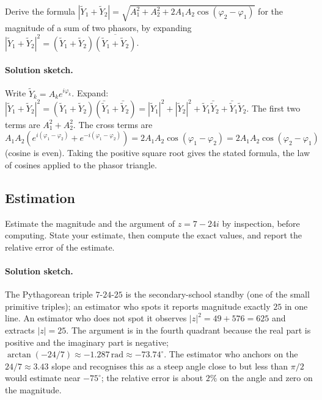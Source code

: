 \begin{exercise}
Derive the formula $|\tilde{Y}_{1} + \tilde{Y}_{2}| = \sqrt{A_{1}^{2}
+ A_{2}^{2} + 2 A_{1} A_{2}\cos(\varphi_{2} - \varphi_{1})}$
for the magnitude of a sum of two phasors, by expanding
$|\tilde{Y}_{1} + \tilde{Y}_{2}|^{2} = (\tilde{Y}_{1} +
\tilde{Y}_{2})\overline{(\tilde{Y}_{1} + \tilde{Y}_{2})}$.

\paragraph{Solution sketch.}
Write $\tilde Y_{k} = A_{k} e^{i\varphi_{k}}$. Expand:
$|\tilde Y_{1} + \tilde Y_{2}|^{2} = (\tilde Y_{1} + \tilde
Y_{2})(\bar{\tilde Y}_{1} + \bar{\tilde Y}_{2}) = |\tilde Y_{1}|^{2}
+ |\tilde Y_{2}|^{2} + \tilde Y_{1} \bar{\tilde Y}_{2} +
\bar{\tilde Y}_{1} \tilde Y_{2}$. The first two terms are $A_{1}^{2}
+ A_{2}^{2}$. The cross terms are $A_{1} A_{2} (e^{i(\varphi_{1}
- \varphi_{2})} + e^{-i(\varphi_{1} - \varphi_{2})}) = 2 A_{1}
A_{2} \cos(\varphi_{1} - \varphi_{2}) = 2 A_{1} A_{2} \cos(\varphi_{2}
- \varphi_{1})$ (cosine is even). Taking the positive square root
gives the stated formula, the law of cosines applied to the
phasor triangle.
\end{exercise}

\subsection*{Estimation}

\begin{exercise}
Estimate the magnitude and the argument of $z = 7 - 24i$ by
inspection, before computing. State your estimate, then compute
the exact values, and report the relative error of the estimate.

\paragraph{Solution sketch.}
The Pythagorean triple $7$-$24$-$25$ is the secondary-school
standby (one of the small primitive triples); an estimator who
spots it reports magnitude exactly $25$ in one line. An estimator
who does not spot it observes $|z|^{2} = 49 + 576 = 625$ and
extracts $|z| = 25$. The argument is in the fourth quadrant
because the real part is positive and the imaginary part is
negative; $\arctan(-24/7) \approx -1.287\,\text{rad} \approx
-73.74^{\circ}$. The estimator who anchors on the $24/7 \approx
3.43$ slope and recognises this as a steep angle close to but
less than $\pi/2$ would estimate near $-75^{\circ}$; the relative
error is about $2\%$ on the angle and zero on the magnitude.
\end{exercise}

